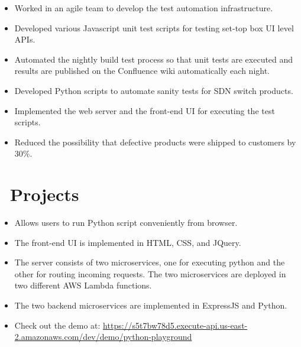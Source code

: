 \documentclass{resume}
\begin{document}
\begin{itemize}
	\item Worked in an agile team to develop the test automation infrastructure.
	\item Developed various Javascript unit test scripts for testing set-top box UI level APIs.
	\item Automated the nightly build test process so that unit tests are executed and results are published on the Confluence wiki automatically each night.
\end{itemize}

\begin{itemize}
	\item Developed Python scripts to automate sanity tests for SDN switch products.
	\item Implemented the web server and the front-end UI for executing the test scripts. 
	\item Reduced the possibility that defective products were shipped to customers by 30\%.
\end{itemize}

\section{\faUsers\ Projects}
\begin{itemize}
	\item Allows users to run Python script conveniently from browser. 
	\item The front-end UI is implemented in HTML, CSS, and JQuery.
	\item The server consists of two microservices, one for executing python and the other for routing incoming requests. The two microservices are deployed in two different AWS Lambda functions.
	\item The two backend microservices are implemented in ExpressJS and Python.
	\item Check out the demo at: \url{https://s5t7bw78d5.execute-api.us-east-2.amazonaws.com/dev/demo/python-playground}  
\end{itemize}
\end{document}
